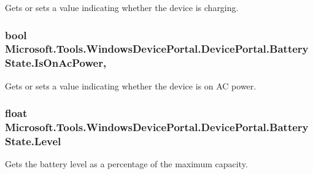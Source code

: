 Gets or sets a value indicating whether the device is charging. 

\subsubsection[{\texorpdfstring{Is\+On\+Ac\+Power}{IsOnAcPower}}]{\setlength{\rightskip}{0pt plus 5cm}bool Microsoft.\+Tools.\+Windows\+Device\+Portal.\+Device\+Portal.\+Battery\+State.\+Is\+On\+Ac\+Power\hspace{0.3cm}{\ttfamily [get]}, {\ttfamily [set]}}\hypertarget{class_microsoft_1_1_tools_1_1_windows_device_portal_1_1_device_portal_1_1_battery_state_a5d670b15a530a9dc912e1c143a1e6bbb}{}\label{class_microsoft_1_1_tools_1_1_windows_device_portal_1_1_device_portal_1_1_battery_state_a5d670b15a530a9dc912e1c143a1e6bbb}


Gets or sets a value indicating whether the device is on AC power. 

\subsubsection[{\texorpdfstring{Level}{Level}}]{\setlength{\rightskip}{0pt plus 5cm}float Microsoft.\+Tools.\+Windows\+Device\+Portal.\+Device\+Portal.\+Battery\+State.\+Level\hspace{0.3cm}{\ttfamily [get]}}\hypertarget{class_microsoft_1_1_tools_1_1_windows_device_portal_1_1_device_portal_1_1_battery_state_a8f5b46ac830b139f0549cc144f9ba499}{}\label{class_microsoft_1_1_tools_1_1_windows_device_portal_1_1_device_portal_1_1_battery_state_a8f5b46ac830b139f0549cc144f9ba499}


Gets the battery level as a percentage of the maximum capacity. 

